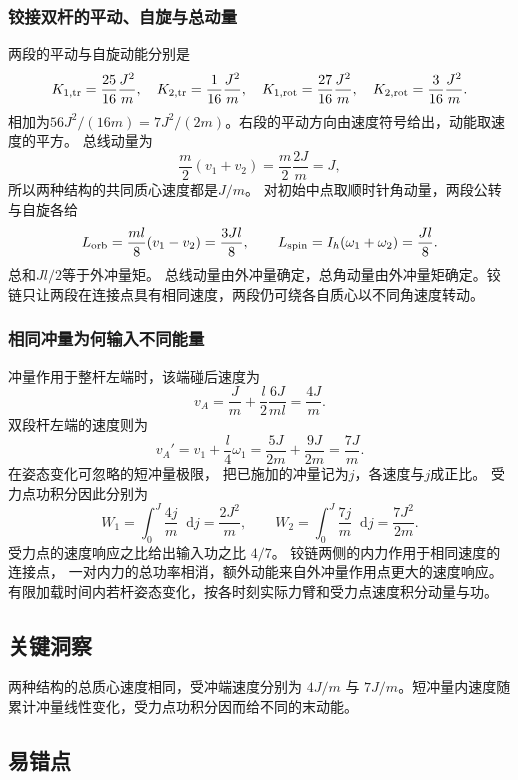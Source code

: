 \documentclass[UTF8,fontset=fandol,a4paper,11pt]{ctexart}
\newcommand{\dd}{\mathop{}\!\mathrm{d}}
\begin{document}
\subsubsection*{铰接双杆的平动、自旋与总动量}
两段的平动与自旋动能分别是
\[
K_{1,\rm tr}=\frac{25}{16}\frac{J^2}m,\quad
K_{2,\rm tr}=\frac1{16}\frac{J^2}m,
\quad K_{1,\rm rot}=\frac{27}{16}\frac{J^2}m,\quad
K_{2,\rm rot}=\frac3{16}\frac{J^2}m.
\]
相加为$56J^2/(16m)=7J^2/(2m)$。右段的平动方向由速度符号给出，动能取速度的平方。
总线动量为
\[
\frac m2(v_1+v_2)=\frac m2\frac{2J}m=J,
\]
所以两种结构的共同质心速度都是$J/m$。
对初始中点取顺时针角动量，两段公转与自旋各给
\[
L_{\rm orb}=\frac{ml}{8}(v_1-v_2)=\frac{3Jl}{8},
\qquad
L_{\rm spin}=I_h(\omega_1+\omega_2)=\frac{Jl}{8}.
\]
总和$Jl/2$等于外冲量矩。
总线动量由外冲量确定，总角动量由外冲量矩确定。铰链只让两段在连接点具有相同速度，两段仍可绕各自质心以不同角速度转动。

\subsubsection*{相同冲量为何输入不同能量}
冲量作用于整杆左端时，该端碰后速度为
\[
v_A=\frac Jm+\frac l2\frac{6J}{ml}=\frac{4J}m.
\]
双段杆左端的速度则为
\[
v_A'=v_1+\frac l4\omega_1
=\frac{5J}{2m}+\frac{9J}{2m}=\frac{7J}m.
\]
在姿态变化可忽略的短冲量极限，
把已施加的冲量记为$j$，各速度与$j$成正比。
受力点功积分因此分别为
\[
W_1=\int_0^J\frac{4j}m\dd j=\frac{2J^2}m,
\qquad
W_2=\int_0^J\frac{7j}m\dd j=\frac{7J^2}{2m}.
\]
受力点的速度响应之比给出输入功之比 $4/7$。
铰链两侧的内力作用于相同速度的连接点，
一对内力的总功率相消，额外动能来自外冲量作用点更大的速度响应。
有限加载时间内若杆姿态变化，按各时刻实际力臂和受力点速度积分动量与功。




\subsection*{关键洞察}

两种结构的总质心速度相同，受冲端速度分别为 $4J/m$ 与 $7J/m$。短冲量内速度随累计冲量线性变化，受力点功积分因而给不同的末动能。



\subsection*{易错点}
\end{document}
